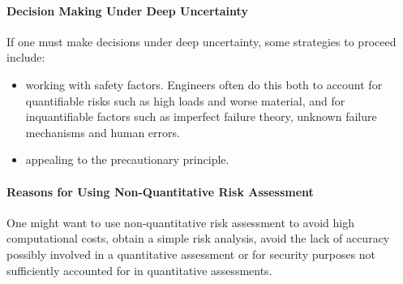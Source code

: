 \paragraph{Decision Making Under Deep Uncertainty}
If one must make decisions under deep uncertainty, some strategies to proceed include:
\begin{itemize}
	\item working with safety factors. Engineers often do this both to account for quantifiable risks such as high loads and worse material, and for inquantifiable factors such as imperfect failure theory, unknown failure mechanisms and human errors.
	\item appealing to the precautionary principle.
\end{itemize}

\paragraph{Reasons for Using Non-Quantitative Risk Assessment}
One might want to use non-quantitative risk assessment to avoid high computational costs, obtain a simple risk analysis, avoid the lack of accuracy possibly involved in a quantitative assessment or for security purposes not sufficiently accounted for in quantitative assessments.